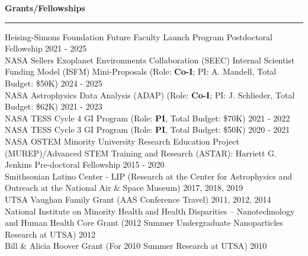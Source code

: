 \documentclass[letter,12pt]{article}
\begin{document}
\noindent
{\bf Grants/Fellowships} \\
\vspace{-10mm}
\begin{center}
\rule{\textwidth}{0.2mm}
\end{center}
\vspace{-3mm}
\noindent
Heising-Simons Foundation Future Faculty Launch Program Postdoctoral Fellowship \hfill 2021 - 2025 \\
NASA Sellers Exoplanet Environments Collaboration (SEEC) Internal Scientist Funding Model (ISFM) Mini-Proposals (Role: \textbf{Co-I}; PI: A. Mandell, Total Budget: \$50K)  \hfill 2024 - 2025 \\ 
NASA Astrophysics Data Analysis (ADAP) (Role: \textbf{Co-I}; PI: J. Schlieder, Total Budget:  \$62K) \hfill 2021 - 2023 \\
NASA TESS Cycle 4 GI Program (Role: {\bf PI}, Total Budget: \$70K) \hfill 2021 - 2022 \\
NASA TESS Cycle 3 GI Program (Role: {\bf PI}, Total Budget: \$50K) \hfill 2020 - 2021 \\
NASA OSTEM Minority University Research Education Project (MUREP)/Advanced STEM Training and Research (ASTAR): Harriett G. Jenkins Pre-doctoral Fellowship \hfill 2015 - 2020 \\
Smithsonian Latino Center - LIP (Research at the Center for Astrophysics and Outreach at the National Air \& Space Museum) \hfill 2017, 2018, 2019 \\
UTSA Vaughan Family Grant (AAS Conference Travel) \hfill 2011, 2012, 2014 \\
National Institute on Minority Health and Health Disparities – Nanotechnology and Human Health Core Grant (2012 Summer Undergraduate Nanoparticles Research at UTSA) \hfill 2012 \\
Bill \& Alicia Hoover Grant (For 2010 Summer Research at UTSA) \hfill 2010 \\
\end{document}
